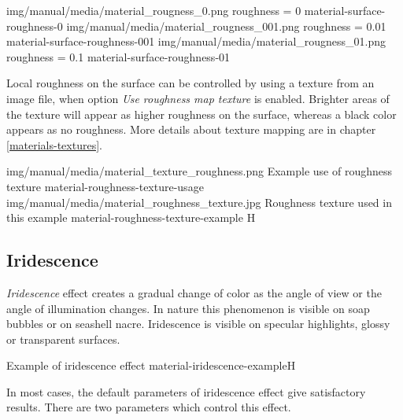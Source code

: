 \threeImagesWithTwoCaptionsFullWidth
{img/manual/media/material_rougness_0.png}
{roughness = 0}
{material-surface-roughness-0}
{img/manual/media/material_rougness_001.png}
{roughness = 0.01}
{material-surface-roughness-001}
{img/manual/media/material_rougness_01.png}
{roughness = 0.1}
{material-surface-roughness-01}

Local roughness on the surface can be controlled by using a texture from an image file, when option \emph{Use roughness map texture} is enabled. Brighter areas of the texture will appear as higher roughness on the surface, whereas a black color appears as no roughness. More details about texture mapping are in chapter \ref{materials-textures}.

\twoImagesWithTwoCaptionsFullWidth
{img/manual/media/material_texture_roughness.png}
{Example use of roughness texture}
{material-roughness-texture-usage}
{img/manual/media/material_roughness_texture.jpg}
{Roughness texture used in this example}
{material-roughness-texture-example}
{H}

\subsection{Iridescence}\label{materials-iridescence}

\emph{Iridescence} effect creates a gradual change of color as the angle of view or the angle of illumination changes. In nature this phenomenon is visible on soap bubbles or on seashell nacre. 
Iridescence is visible on specular highlights, glossy or transparent surfaces. 

 {Example of iridescence effect}
 {material-iridescence-example}{H}

In most cases, the default parameters of iridescence effect give satisfactory results. There are two parameters which control this effect.

